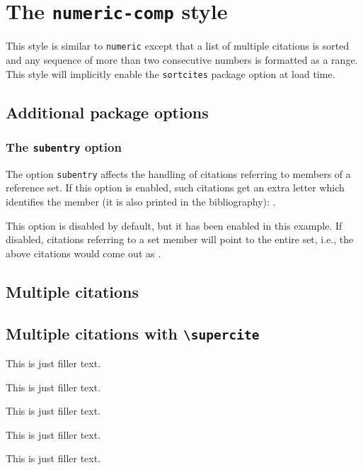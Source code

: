 \documentclass[a4paper]{article}
\newcommand{\cmd}[1]{\texttt{\textbackslash #1}}
\begin{document}
\section*{The \texttt{numeric-comp} style}

This style is similar to \texttt{numeric} except that a list of
multiple citations is sorted and any sequence of more than two
consecutive numbers is formatted as a range. This style will
implicitly enable the \texttt{sortcites} package option at load
time.

\subsection*{Additional package options}

\subsubsection*{The \texttt{subentry} option}

The option \texttt{subentry} affects the handling of citations
referring to members of a reference set. If this option is enabled,
such citations get an extra letter which identifies the member
(it is also printed in the bibliography):
\cite{glashow,yoon,salam,aksin,companion}.

This option is disabled by default, but it has been enabled
in this example. If disabled, citations referring to a set member
will point to the entire set, i.e., the above citations would
come out as
\cite{stdmodel,set,stdmodel,set,companion}.

\subsection*{Multiple citations}

\cite{bertram,augustine}

\cite{murray,bertram,augustine,companion,cotton}

\cite{augustine,bertram,cotton,hammond,set,massa,murray}

\cite{bertram,companion,cotton,augustine,massa,set,hammond,murray,stdmodel}

\cite{yoon,weinberg}

\subsection*{Multiple citations with \cmd{supercite}}

This is just filler text.\supercite{bertram,augustine}

This is just filler text.\supercite{murray,bertram,augustine,companion,cotton}

This is just filler text.\supercite{augustine,bertram,cotton,hammond,set,massa,murray}

This is just filler text.\supercite{bertram,companion,cotton,augustine,massa,set,hammond,murray,stdmodel}

This is just filler text.\supercite{yoon,weinberg}

\clearpage
\printbibliography
\end{document}
